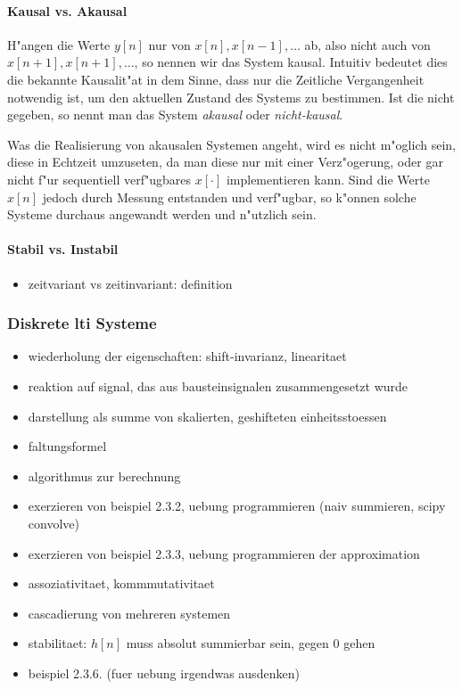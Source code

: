 \paragraph{Kausal vs. Akausal} H"angen die Werte $y[n]$ nur von $x[n], x[n-1], \dots$ ab, also nicht auch von $x[n+1], x[n+1], \dots$, so nennen wir das System kausal.
Intuitiv bedeutet dies die bekannte Kausalit"at in dem Sinne, dass nur die Zeitliche Vergangenheit notwendig ist, um den aktuellen Zustand des Systems zu bestimmen.
Ist die nicht gegeben, so nennt man das System \emph{akausal} oder \emph{nicht-kausal}.

Was die Realisierung von akausalen Systemen angeht, wird es nicht m"oglich sein, diese in Echtzeit umzuseten, da man diese nur mit einer Verz"ogerung, oder gar nicht f"ur sequentiell verf"ugbares $x[\cdot]$ implementieren kann.
Sind die Werte $x[n]$ jedoch durch Messung entstanden und  verf"ugbar, so k"onnen solche Systeme durchaus angewandt werden und n"utzlich sein.

\paragraph{Stabil vs. Instabil}

\begin{itemize}
    \item zeitvariant vs zeitinvariant: definition
\end{itemize}

\subsubsection{Diskrete \texorpdfstring{\acrshort{lti}}{LTI} Systeme}\label{disc_lti}

\begin{itemize}
    \item wiederholung der eigenschaften: shift-invarianz, linearitaet
    \item reaktion auf signal, das aus bausteinsignalen zusammengesetzt wurde
    \item darstellung als summe von skalierten, geshifteten einheitsstoessen
    \item faltungsformel
    \item algorithmus zur berechnung
    \item exerzieren von beispiel 2.3.2, uebung programmieren (naiv summieren, scipy convolve)
    \item exerzieren von beispiel 2.3.3, uebung programmieren der approximation
    \item assoziativitaet, kommmutativitaet
    \item cascadierung von mehreren systemen
    \item stabilitaet: $h[n]$ muss absolut summierbar sein, gegen $0$ gehen
    \item beispiel 2.3.6. (fuer uebung irgendwas ausdenken)
\end{itemize}

